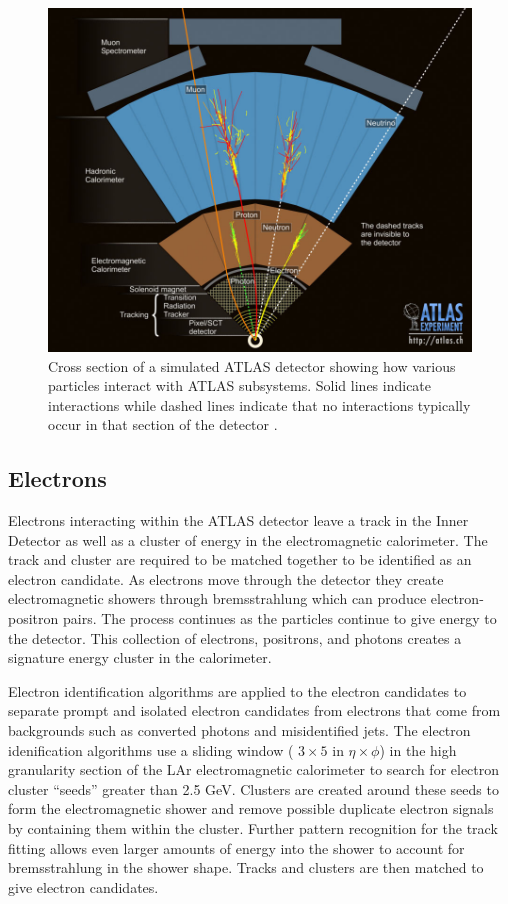 \begin{figure}[h]
	\centering
	\includegraphics[width=\columnwidth]{../ThesisImages/Simulation/ParticleInteractions.jpg}
	\caption[Cross section of a simulated ATLAS detector showing how various particles interact with ATLAS subsystems.]{Cross section of a simulated ATLAS detector showing how various particles interact with ATLAS subsystems.  Solid lines indicate interactions while dashed lines indicate that no interactions typically occur in that section of the detector \cite{ParticleInteractions}.
	}
	\label{fig:ATLASInteractions}
\end{figure}


\subsection{Electrons}
Electrons interacting within the ATLAS detector leave a track in the Inner Detector as well as a cluster of energy in the electromagnetic calorimeter.  The track and cluster are required to be matched together to be identified as an electron candidate\cite{ElectronID}.  As electrons move through the detector they create electromagnetic showers through bremsstrahlung which can produce electron-positron pairs.  The process continues as the particles continue to give energy to the detector.  This collection of electrons, positrons, and photons creates a signature energy cluster in the calorimeter.  

Electron identification algorithms are applied to the electron candidates to separate prompt and isolated electron candidates from electrons that come from backgrounds such as converted photons and misidentified jets.  The electron idenification algorithms use a sliding window ( $3\times5$ in $\eta \times \phi$) in the high granularity section of the LAr electromagnetic calorimeter to search for electron cluster ``seeds'' greater than 2.5 GeV.  Clusters are created around these seeds to form the electromagnetic shower and remove possible duplicate electron signals by containing them within the cluster.  Further pattern recognition for the track fitting allows even larger amounts of energy into the shower to account for bremsstrahlung in the shower shape.  Tracks and clusters are then matched to give electron candidates.  

